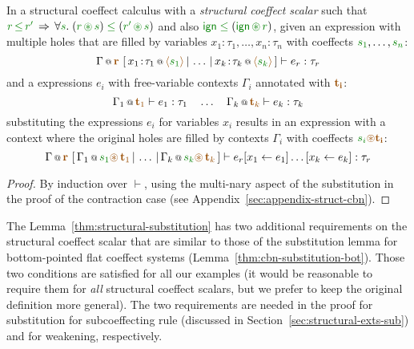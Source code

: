 \begin{lemma}
\label{thm:structural-substitution}
In a structural coeffect calculus with a \emph{structural coeffect scalar} such that
$\cclrd{r}\,\cleq\,\cclrd{r'} \, \Rightarrow \, \forall\cclrd{s}.\;(\cclrd{r}\,\cseq\,\cclrd{s})\;\cleq\;(\cclrd{r'}\,\cseq\,\cclrd{s})$
and also $\czero \;\cleq\; (\czero\,\cseq\,\cclrd{r})$,
given an expression with multiple holes that are filled by variables $x_1\!:\!\tau_1,\ldots,x_n\!:\!\tau_n$ with coeffects $\cclrd{s_1},\ldots,\cclrd{s_n}$:
%
\begin{equation*}
\coctx{\Gamma}{\aclrd{\textbf{r}}}~[\,\coctx{x_1\!:\!\tau_1}{\alift{\cclrd{s_1}}} \,|\, \ldots \,|\,
  \coctx{x_k\!:\!\tau_k}{\alift{\cclrd{s_k}}}\,] \vdash e_r : \tau_r
\end{equation*}
%
and a expressions $e_i$ with free-variable contexts $\Gamma_i$ annotated with $\aclrd{\mathbf{t_i}}$:
%
\begin{equation*}
\coctx{\Gamma_1}{\aclrd{\textbf{t}_1}} \vdash e_1 : \tau_1
\quad \ldots \quad
\coctx{\Gamma_k}{\aclrd{\textbf{t}_k}} \vdash e_k : \tau_k
\end{equation*}
%
substituting the expressions $e_i$ for variables $x_i$ results in an expression with a context
where the original holes are filled by contexts $\Gamma_i$ with coeffects $\cclrd{s_i} \aseq \aclrd{\mathbf{t_i}}$:
%
\begin{equation*}
\coctx{\Gamma}{\aclrd{\textbf{r}}}~[\,\coctx{\Gamma_1}{\cclrd{s_1}\aseq\,\aclrd{\textbf{t}_1}} \,|\, \ldots \,|\,
  \coctx{\Gamma_k}{\cclrd{s_k}\aseq\,\aclrd{\textbf{t}_k}}\,] \vdash \subst{\subst{e_r}{x_1}{e_1}\ldots}{x_k}{e_k} : \tau_r
\end{equation*}
\end{lemma}
\begin{proof}
By induction over $\vdash$, using the multi-nary aspect of the substitution
in the proof of the contraction case (see Appendix~\ref{sec:appendix-struct-cbn}).
\end{proof}

The Lemma~\ref{thm:structural-substitution} has two additional requirements on the structural coeffect
scalar that are similar to those of the substitution lemma for bottom-pointed flat coeffect systems
(Lemma~\ref{thm:cbn-substitution-bot}). Those two conditions are satisfied for all our examples
(it would be reasonable to require them for \emph{all} structural coeffect scalars, but we prefer
to keep the original definition more general). The two requirements are needed in the proof
for substitution for subcoeffecting rule (discussed in Section~\ref{sec:structural-exts-sub}) and
for weakening, respectively.

